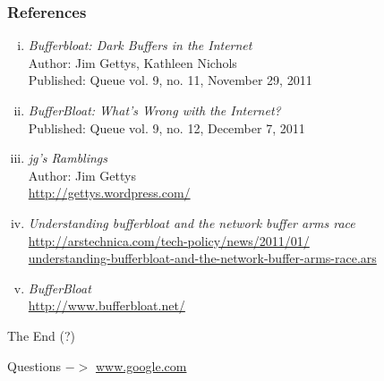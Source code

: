 \documentclass{beamer}
\begin{document}
%
\begin{frame}
\frametitle{References}
\begin{enumerate}[i.-]
\item \textit{Bufferbloat: Dark Buffers in the Internet}\\
	Author: Jim Gettys, Kathleen Nichols\\
	Published: Queue vol. 9, no. 11, November 29, 2011\\
\item \textit{BufferBloat: What's Wrong with the Internet?}\\
	Published: Queue vol. 9, no. 12, December 7, 2011\\
\item \textit{jg's Ramblings}\\
	Author: Jim Gettys\\
	\url{http://gettys.wordpress.com/}\\
\item \textit{Understanding bufferbloat and the network buffer arms race}\\
	\url{http://arstechnica.com/tech-policy/news/2011/01/}\\
	\url{understanding-bufferbloat-and-the-network-buffer-arms-race.ars}\\
\item \textit{BufferBloat}\\
	\url{http://www.bufferbloat.net/}\\
\end{enumerate}
\end{frame}
%
\begin{frame}
\centerline{The End (?)}
\vfill
\centerline{\footnotesize{Questions $->$ \url{www.google.com}}}
\end{frame}
\end{document}
